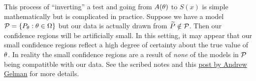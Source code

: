 \begin{remark}
    This process of ``inverting'' a test and going from $A({\theta})$ to $S(x)$ is simple mathematically but is complicated in practice. Suppose we have a model ${\mathcal{P}} = \{P_{\theta} : {\theta} \in {{\Omega}}\}$ but our data is actually drawn from $\widetilde{P} \notin {\mathcal{P}}$. Then our confidence regions will be artificially small. In this setting, it may appear that our small confidence regions reflect a high degree of certainty about the true value of ${\theta}$. In reality the small confidence regions are a result of \emph{none} of the models in ${\mathcal{P}}$ being compatitble with our data. See the scribed notes and this \href{https://statmodeling.stat.columbia.edu/2013/06/24/why-it-doesnt-make-sense-in-general-to-form-confidence-intervals-by-inverting-hypothesis-tests/}{post by Andrew Gelman} for more details.
\end{remark}
